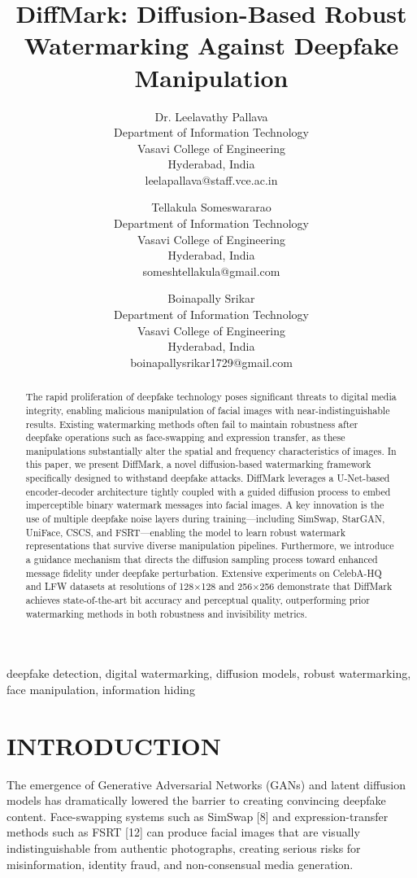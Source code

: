 \documentclass{article}
\title{DiffMark: Diffusion-Based Robust Watermarking Against Deepfake Manipulation}
\author{Dr. Leelavathy Pallava \\ Department of Information Technology \\ Vasavi College of Engineering \\ Hyderabad, India \\ leelapallava@staff.vce.ac.in \and Tellakula Someswararao \\ Department of Information Technology \\ Vasavi College of Engineering \\ Hyderabad, India \\ someshtellakula@gmail.com \and Boinapally Srikar \\ Department of Information Technology \\ Vasavi College of Engineering \\ Hyderabad, India \\ boinapallysrikar1729@gmail.com}
\date{}
\begin{document}
\maketitle

\begin{abstract}
The rapid proliferation of deepfake technology poses significant threats to digital media integrity, enabling malicious manipulation of facial images with near-indistinguishable results. Existing watermarking methods often fail to maintain robustness after deepfake operations such as face-swapping and expression transfer, as these manipulations substantially alter the spatial and frequency characteristics of images. In this paper, we present DiffMark, a novel diffusion-based watermarking framework specifically designed to withstand deepfake attacks. DiffMark leverages a U-Net-based encoder-decoder architecture tightly coupled with a guided diffusion process to embed imperceptible binary watermark messages into facial images. A key innovation is the use of multiple deepfake noise layers during training—including SimSwap, StarGAN, UniFace, CSCS, and FSRT—enabling the model to learn robust watermark representations that survive diverse manipulation pipelines. Furthermore, we introduce a guidance mechanism that directs the diffusion sampling process toward enhanced message fidelity under deepfake perturbation. Extensive experiments on CelebA-HQ and LFW datasets at resolutions of 128×128 and 256×256 demonstrate that DiffMark achieves state-of-the-art bit accuracy and perceptual quality, outperforming prior watermarking methods in both robustness and invisibility metrics.
\end{abstract}

\begin{keywords}
deepfake detection, digital watermarking, diffusion models, robust watermarking, face manipulation, information hiding
\end{keywords}

\section{INTRODUCTION}
The emergence of Generative Adversarial Networks (GANs) and latent diffusion models has dramatically lowered the barrier to creating convincing deepfake content. Face-swapping systems such as SimSwap [8] and expression-transfer methods such as FSRT [12] can produce facial images that are visually indistinguishable from authentic photographs, creating serious risks for misinformation, identity fraud, and non-consensual media generation.
\end{document}

